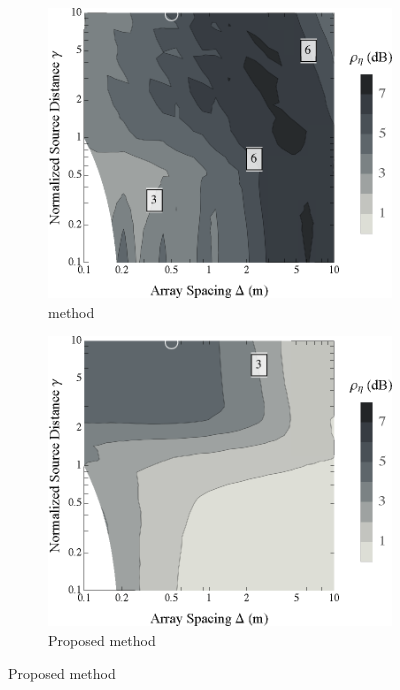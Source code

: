 \begin{figure}[t]
	\centering
	\begin{subfigure}[b]{0.49\textwidth}
		\includegraphics[width=\textwidth]{09_thiergart_comparison/figures/scharer2009_contour_thiergart_marked.eps}
		\caption{\citet{Thiergart2013} method}
		\label{fig:09_Thiergart_Comparison:Spectral_Errors:Thiergart}
	\end{subfigure}
	\hfill
	\begin{subfigure}[b]{0.49\textwidth}
		\includegraphics[width=\textwidth]{09_thiergart_comparison/figures/scharer2009_contour_validhybrid_marked.eps}
		\caption{Proposed method}
		\label{fig:09_Thiergart_Comparison:Spectral_Errors:Hybrid}
	\end{subfigure}
	

\end{figure}
